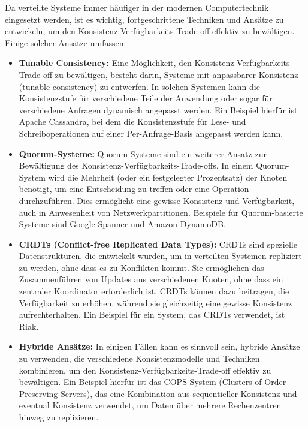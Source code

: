 \documentclass[../vs-script-first-v01.tex]{subfiles}
\begin{document}
Da verteilte Systeme immer häufiger in der modernen Computertechnik eingesetzt werden, ist es wichtig, fortgeschrittene Techniken und Ansätze zu entwickeln, um den Konsistenz-Verfügbarkeits-Trade-off effektiv zu bewältigen. Einige solcher Ansätze umfassen:
\begin{itemize}
\item \textbf{Tunable Consistency:} Eine Möglichkeit, den Konsistenz-Verfügbarkeits-Trade-off zu bewältigen, besteht darin, Systeme mit anpassbarer Konsistenz (tunable consistency) zu entwerfen. In solchen Systemen kann die Konsistenzstufe für verschiedene Teile der Anwendung oder sogar für verschiedene Anfragen dynamisch angepasst werden. Ein Beispiel hierfür ist Apache Cassandra, bei dem die Konsistenzstufe für Lese- und Schreiboperationen auf einer Per-Anfrage-Basis angepasst werden kann.
\item \textbf{Quorum-Systeme:} Quorum-Systeme sind ein weiterer Ansatz zur Bewältigung des Konsistenz-Verfügbarkeits-Trade-offs. In einem Quorum-System wird die Mehrheit (oder ein festgelegter Prozentsatz) der Knoten benötigt, um eine Entscheidung zu treffen oder eine Operation durchzuführen. Dies ermöglicht eine gewisse Konsistenz und Verfügbarkeit, auch in Anwesenheit von Netzwerkpartitionen. Beispiele für Quorum-basierte Systeme sind Google Spanner und Amazon DynamoDB.
\item \textbf{CRDTs (Conflict-free Replicated Data Types):} CRDTs sind spezielle Datenstrukturen, die entwickelt wurden, um in verteilten Systemen repliziert zu werden, ohne dass es zu Konflikten kommt. Sie ermöglichen das Zusammenführen von Updates aus verschiedenen Knoten, ohne dass ein zentraler Koordinator erforderlich ist. CRDTs können dazu beitragen, die Verfügbarkeit zu erhöhen, während sie gleichzeitig eine gewisse Konsistenz aufrechterhalten. Ein Beispiel für ein System, das CRDTs verwendet, ist Riak.
\item \textbf{Hybride Ansätze:} In einigen Fällen kann es sinnvoll sein, hybride Ansätze zu verwenden, die verschiedene Konsistenzmodelle und Techniken kombinieren, um den Konsistenz-Verfügbarkeits-Trade-off effektiv zu bewältigen. Ein Beispiel hierfür ist das COPS-System (Clusters of Order-Preserving Servers), das eine Kombination aus sequentieller Konsistenz und eventual Konsistenz verwendet, um Daten über mehrere Rechenzentren hinweg zu replizieren.
\end{itemize}
\end{document}
